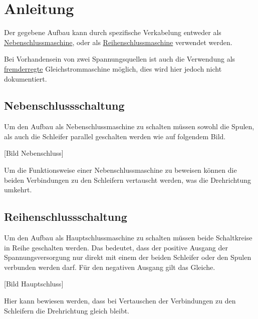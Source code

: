 \section{Anleitung}

Der gegebene Aufbau kann durch spezifische Verkabelung entweder als \hyperref[neben]{Nebenschlussmaschine}, oder als \hyperref[reihen]{Reihenschlussmaschine} verwendet werden.

Bei Vorhandensein von zwei Spannungsquellen ist auch die Verwendung als \hyperref[fremd]{fremderregte} Gleichstrommaschine möglich, dies wird hier jedoch nicht dokumentiert.

\subsection{Nebenschlussschaltung}

Um den Aufbau als Nebenschlussmaschine zu schalten müssen sowohl die Spulen, als auch die Schleifer parallel geschalten werden wie auf folgendem Bild.

[Bild Nebenschluss]

Um die Funktionsweise einer Nebenschlussmaschine zu beweisen können die beiden Verbindungen zu den Schleifern vertauscht werden, was die Drehrichtung umkehrt.

\subsection{Reihenschlussschaltung}

Um den Aufbau als Hauptschlussmaschine zu schalten müssen beide Schaltkreise in Reihe geschalten werden.
Das bedeutet, dass der positive Ausgang der Spannungsversorgung nur direkt mit einem der beiden Schleifer oder den Spulen verbunden werden darf.
Für den negativen Ausgang gilt das Gleiche.

[Bild Hauptschluss]

Hier kann bewiesen werden, dass bei Vertauschen der Verbindungen zu den Schleifern die Drehrichtung gleich bleibt.